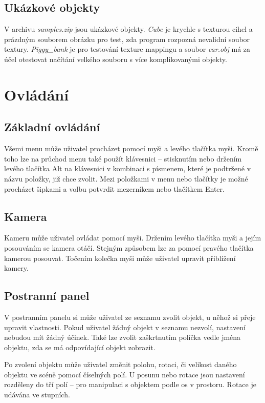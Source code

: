 \documentclass[a4paper, 11pt]{report}
\begin{document}
\section{Ukázkové objekty}
V archivu \emph{samples.zip} jsou ukázkové objekty. \emph{Cube} je krychle s texturou cihel a prázdným souborem obrázku pro test, zda program rozpozná nevalidní soubor textury. \emph{Piggy\_bank} je pro testování texture mappingu a soubor \emph{car.obj} má za účel otestovat načítání velkého souboru s více komplikovanými objekty.

\chapter{Ovládání}
\section{Základní ovládání}
Všemi menu může uživatel procházet pomocí myši a levého tlačítka myši. Kromě toho lze na průchod menu také použít klávesnici -- stisknutím nebo držením levého tlačítka Alt na klávesnici v kombinaci s písmenem, které je podtržené v názvu položky, již chce zvolit. Mezi položkami v menu nebo tlačítky je možné procházet šipkami a volbu potvrdit mezerníkem nebo tlačítkem Enter.

\section{\label{ovladaniKamery}Kamera}
Kameru může uživatel ovládat pomocí myši. Držením levého tlačítka myši a jejím posouváním se kamera otáčí. Stejným způsobem lze za pomocí pravého tlačítka kamerou posouvat. Točením kolečka myši může uživatel upravit přiblížení kamery.

\section{\label{panel}Postranní panel}
V postranním panelu si může uživatel ze seznamu zvolit objekt, u něhož si přeje upravit vlastnosti. Pokud uživatel žádný objekt v seznamu nezvolí, nastavení nebudou mít žádný účinek. Také lze zvolit zaškrtnutím políčka vedle jména objektu, zda se má odpovídající objekt zobrazit.

Po zvolení objektu může uživatel změnit polohu, rotaci, či velikost daného objektu ve scéně pomocí číselných polí. U posunu nebo rotace jsou nastavení rozděleny do tří polí -- pro manipulaci s objektem podle os v prostoru. Rotace je udávána ve stupních.
\end{document}
